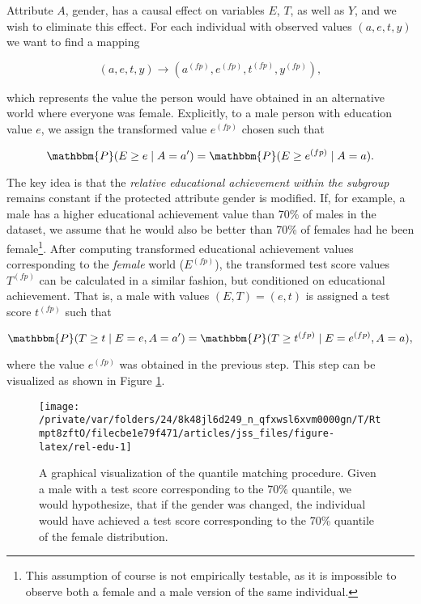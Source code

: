 \documentclass[
  nojss]{jss}
\begin{document}
Attribute \(A\), gender, has a causal effect on variables \(E\), \(T\),
as well as \(Y\), and we wish to eliminate this effect. For each
individual with observed values \((a, e, t, y)\) we want to find a
mapping

\[(a, e, t, y) \longrightarrow  ( {a}^{(fp)},  {e}^{(fp)},  {t}^{(fp)},  {y}^{(fp)}),\]

which represents the value the person would have obtained in an
alternative world where everyone was female. Explicitly, to a male
person with education value \(e\), we assign the transformed value
\( {e}^{(fp)}\) chosen such that

\[\mathbbm{P}(E \geq e \mid A = a') = \mathbbm{P}(E \geq  {e}^{(fp)} \mid A = a).\]

The key idea is that the \emph{relative educational achievement within
the subgroup} remains constant if the protected attribute gender is
modified. If, for example, a male has a higher educational achievement
value than 70\% of males in the dataset, we assume that he would also be
better than 70\% of females had he been female\footnote{This assumption
  of course is not empirically testable, as it is impossible to observe
  both a female and a male version of the same individual.}. After
computing transformed educational achievement values corresponding to
the \emph{female} world (\( {E}^{(fp)}\)), the transformed test score
values \( {T}^{(fp)}\) can be calculated in a similar fashion, but
conditioned on educational achievement. That is, a male with values
\((E, T) = (e, t)\) is assigned a test score \( {t}^{(fp)}\) such that

\[\mathbbm{P}(T \geq t \mid E = e, A = a') = \mathbbm{P}(T \geq  {t}^{(fp)} \mid E =  {e}^{(fp)}, A = a),\]

where the value \( {e}^{(fp)}\) was obtained in the previous step. This
step can be visualized as shown in Figure \ref{fig:rel-edu}.

\begin{CodeChunk}
\begin{figure}

{\centering \texttt{[image: /private/var/folders/24/8k48jl6d249\_n\_qfxwsl6xvm0000gn/T/Rtmpt8zftO/filecbe1e79f471/articles/jss\_files/figure-latex/rel-edu-1]} 

}

\caption[A graphical visualization of the quantile matching procedure]{A graphical visualization of the quantile matching procedure. Given a male with a test score corresponding to the 70\% quantile, we would hypothesize, that if the gender was changed, the individual would have achieved a test score corresponding to the 70\% quantile of the female distribution.}\label{fig:rel-edu}
\end{figure}
\end{CodeChunk}
\end{document}
